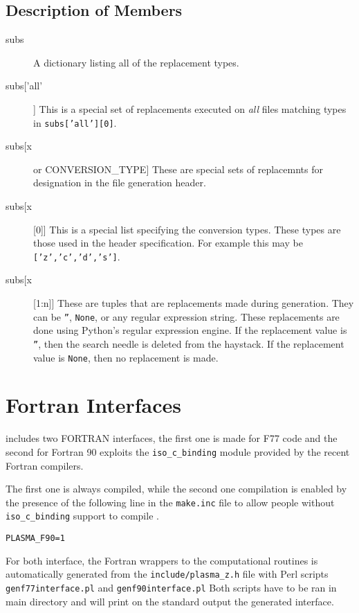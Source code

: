 \subsection{Description of Members}
\label{codegen:moddescription}
\begin{description}
\item[subs]
A dictionary listing all of the replacement types.
\item[subs['all']]
This is a special set of replacements executed on {\em all} files matching types in {\tt subs['all'][0]}.
\item[subs[x] or CONVERSION\_TYPE]
These are special sets of replacemnts for designation in the file generation header.
\item[subs[x][0]]
This is a special list specifying the conversion types.  These types are those used in the
header specification. For example this may be {\tt ['z','c','d','s']}.
\item[subs[x][1:n]]
These are tuples that are replacements made during generation.  They can be {\tt ''}, {\tt None}, or any
regular expression string.  These replacements are done using Python's regular expression engine.
If the replacement value is {\tt ''}, then the search needle is deleted from the haystack.
If the replacement value is {\tt None}, then no replacement is made.

\end{description}

\section{Fortran Interfaces}

\plasma includes two FORTRAN interfaces, the first one is made for
F77 code and the second for Fortran 90 exploits the \texttt{iso\_c\_binding}
module provided by the recent Fortran compilers.

The first one is always compiled, while the second one compilation is
enabled by the presence of the following line in the \texttt{make.inc}
file to allow people without \texttt{iso\_c\_binding} support to
compile \plasma.
\begin{verbatim}
PLASMA_F90=1
\end{verbatim}

For both interface, the Fortran wrappers to the computational routines
is automatically generated from the \texttt{include/plasma\_z.h}
file with Perl scripts \texttt{genf77interface.pl} and \texttt{genf90interface.pl}
Both scripts have to be ran in \plasma main directory and will print
on the standard output the generated interface.
